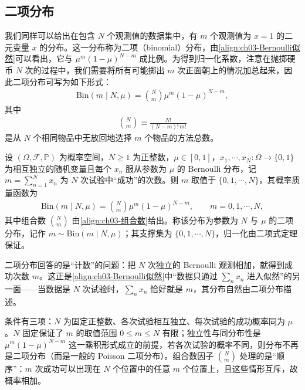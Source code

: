 \documentclass[../../main.tex]{subfiles}
\begin{document}
\subsection{二项分布}\label{subsection:ch03-二项分布}

我们同样可以给出在包含 $N$ 个观测值的数据集中，有 $m$ 个观测值为 $x=1$ 的二元变量 $x$ 的分布。这一分布称为二项（binomial）分布，由\cref{align:ch03-Bernoulli似然}可以看出，它与 $\mu^{m}(1-\mu)^{N-m}$ 成比例。为得到归一化系数，注意在抛掷硬币 $N$ 次的过程中，我们需要将所有可能掷出 $m$ 次正面朝上的情况加总起来，因此二项分布可写为如下形式：
\begin{align}
\mathrm{Bin}(m\mid N,\mu)=\binom{N}{m}\mu^{m}(1-\mu)^{N-m},
\label{align:ch03-二项分布}
\end{align}
其中
\begin{align}
\binom{N}{m}\equiv\frac{N!}{(N-m)!\,m!}
\label{align:ch03-组合数}
\end{align}
是从 $N$ 个相同物品中无放回地选择 $m$ 个物品的方法总数。

\begin{definition}[二项分布]\label{definition:ch03-二项分布}
设 $(\Omega,\mathcal{F},\mathbb{P})$ 为概率空间，$N\geqslant1$ 为正整数，$\mu\in[0,1]$，$x_1,\cdots,x_N:\Omega\to\{0,1\}$ 为相互独立的随机变量且每个 $x_n$ 服从参数为 $\mu$ 的 Bernoulli 分布，记 $m=\sum_{n=1}^{N}x_n$ 为 $N$ 次试验中“成功”的次数。则 $m$ 取值于 $\{0,1,\cdots,N\}$，其概率质量函数为
\begin{align*}
\mathrm{Bin}(m\mid N,\mu)=\binom{N}{m}\mu^{m}(1-\mu)^{N-m},\qquad m=0,1,\cdots,N,
\end{align*}
其中组合数 $\binom{N}{m}$ 由\eqref{align:ch03-组合数}给出。称该分布为参数为 $N$ 与 $\mu$ 的二项分布，记作 $m\sim\mathrm{Bin}(m\mid N,\mu)$；其支撑集为 $\{0,1,\cdots,N\}$，归一化由二项式定理保证。
\end{definition}

\begin{remark}
二项分布回答的是“计数”的问题：把 $N$ 次独立的 Bernoulli 观测相加，就得到成功次数 $m$。这正是\cref{align:ch03-Bernoulli似然}中“数据只通过 $\sum_n x_n$ 进入似然”的另一面——当数据是 $N$ 次试验时，$\sum_n x_n$ 恰好就是 $m$，其分布自然由二项分布描述。

条件有三项：$N$ 为固定正整数、各次试验相互独立、每次试验的成功概率同为 $\mu$。$N$ 固定保证了 $m$ 的取值范围 $0\leqslant m\leqslant N$ 有限；独立性与同分布性是 $\mu^{m}(1-\mu)^{N-m}$ 这一乘积形式成立的前提，若各次试验的概率不同，则分布不再是二项分布（而是一般的 Poisson 二项分布）。组合数因子 $\binom{N}{m}$ 处理的是“顺序”：$m$ 次成功可以出现在 $N$ 个位置中的任意 $m$ 个位置上，且这些情形互斥，故概率相加。
\end{remark}
\end{document}
